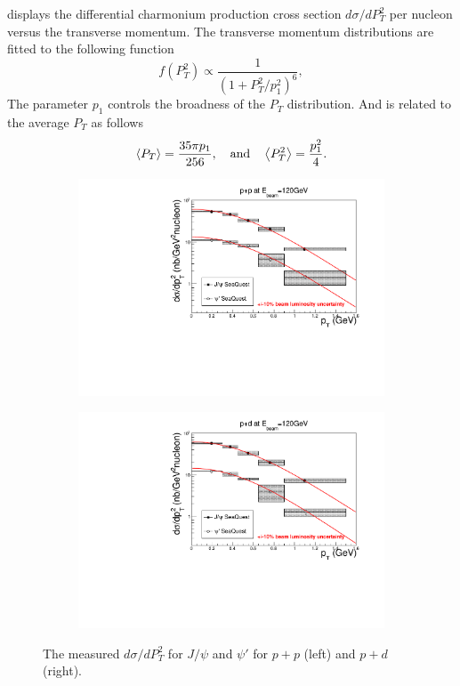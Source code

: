 \documentclass[reprint,aps,unsortedaddress,superscriptaddress,prd,floatfix,showpacs,linenumbers]{revtex4-2}
\begin{document}
 displays the differential charmonium production cross section $d\sigma/d P_T^2$
per nucleon versus the transverse momentum. The transverse momentum distributions are fitted to the
following function\cite{kaplan1978}
\begin{equation}
	f\left(P_T^2\right) \propto \frac{1}{\left(1+ P_T^2/p_1^2\right)^6},
	\label{eq:kaplan}
\end{equation}
The parameter $p_1$ controls the broadness of the $P_T$ distribution. And is
related to the average $P_T$ as follows
\begin{equation}
	\expval{P_T}    = \frac{35\pi p_1}{256}, \quad \mathrm{and}\quad
	\expval{P_T^2}  = \frac{p_1^2}{4}.
	\label{eq:pT_kaplan}
\end{equation}
\begin{figure}[h]
	\begin{subfigure}{0.45\linewidth}
		\includegraphics[width=\linewidth]{crossSections/pT/5-6_pTsq_LH2.pdf}
	\end{subfigure}
	\begin{subfigure}{0.45\linewidth}
		\includegraphics[width=\linewidth]{crossSections/pT/5-6_pTsq_LD2.pdf}
	\end{subfigure}
	\caption{The measured $d\sigma/d P_T^2$ for $J/\psi$ and $\psi'$ for $p+p$ (left) and $p+d$ (right).}
	\label{fig:pT_cross_sections}
\end{figure}
\end{document}
